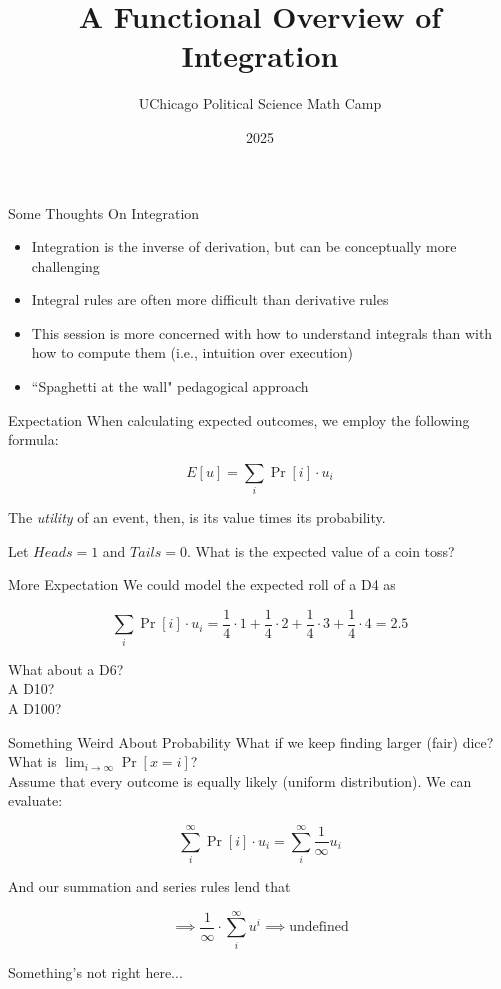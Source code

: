 \documentclass[10pt]{beamer}
\title{A Functional Overview of Integration}
\author{UChicago Political Science Math Camp}
\institute{Ryan Gibbons \& Luke Cain}
\date{2025}
\begin{document}
\frame{\titlepage}

\begin{frame}{Some Thoughts On Integration}
    \begin{itemize}
        \item Integration is the inverse of derivation, but can be conceptually more challenging
        \item Integral rules are often more difficult than derivative rules
        \item This session is more concerned with how to understand integrals than with how to compute them (i.e., intuition over execution)
        \item ``Spaghetti at the wall" pedagogical approach
    \end{itemize}
\end{frame}

\begin{frame}{Expectation}
    When calculating expected outcomes, we employ the following formula:

    \[E[u] = \sum_i \Pr[i] \cdot u_i\]

    The \textit{utility} of an event, then, is its value times its probability. \\

    \vspace{.5cm}

    Let $Heads = 1$ and $Tails = 0$. What is the expected value of a coin toss?
\end{frame}

\begin{frame}{More Expectation}
    We could model the expected roll of a D4 as

    \[\sum_i \Pr[i] \cdot u_i = \frac{1}{4} \cdot 1 + \frac{1}{4} \cdot 2 + \frac{1}{4} \cdot 3 + \frac{1}{4} \cdot 4 = 2.5\]

    What about a D6?\\
    \vspace{.5cm}
    \pause
    A D10? \\
    \vspace{.5cm}
    \pause
    A D100?
\end{frame}

\begin{frame}{Something Weird About Probability}
    What if we keep finding larger (fair) dice? What is $\lim_{i \to \infty}\Pr[x = i]$? \\

    \vspace{.5cm}
    \pause
    Assume that every outcome is equally likely (uniform distribution). We can evaluate:

    \[\sum_i^\infty \Pr[i] \cdot u_i = \sum_i^\infty \frac{1}{\infty} u_i\]

    And our summation and series rules lend that

    \[\implies \frac{1}{\infty} \cdot \sum_i^\infty u^i \implies \text{undefined}\]

    Something's not right here...
    
\end{frame}
\end{document}
